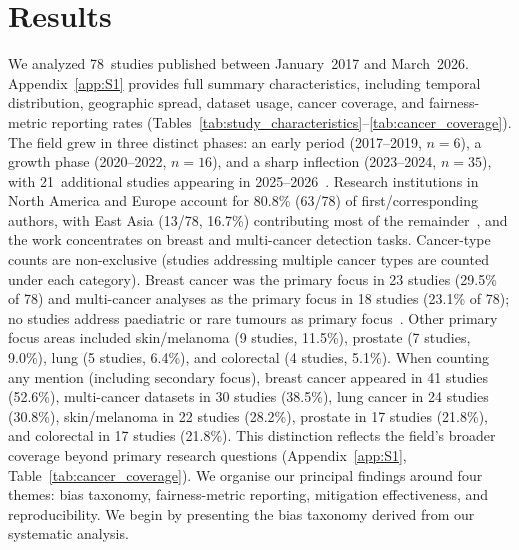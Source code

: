 
\section{Results}
\label{sec:results}

We analyzed 78~studies published between January~2017 and March~2026.
\label{sec:results:temporal}
\label{sec:results:characteristics}
\label{sec:results:cancer}
Appendix~\ref{app:S1} provides full summary characteristics,
including temporal distribution, geographic spread, dataset usage,
cancer coverage, and fairness-metric reporting rates
(Tables~\ref{tab:study_characteristics}--\ref{tab:cancer_coverage}).
The field grew in three distinct phases: an early period (2017--2019,
$n=6$), a growth phase (2020--2022, $n=16$), and a sharp inflection
(2023--2024, $n=35$), with 21~additional studies appearing in
2025--2026~\citep{howard2021site, vaidya2024demographic,
komen2024batch}. Research institutions in North America and Europe account for 80.8\% (63/78) of first/corresponding authors, with East Asia (13/78, 16.7\%) contributing most of the remainder~\citep{celi2022sources, musa2026cross},
and the work concentrates on breast and multi-cancer detection tasks.
Cancer-type counts are non-exclusive (studies addressing multiple cancer types are counted under each category). Breast cancer was the primary focus in 23 studies (29.5\% of 78) and multi-cancer analyses as the primary focus in 18 studies (23.1\% of 78); no studies address paediatric or rare tumours as primary focus~\citep{tasci2022bias}. Other primary focus areas included skin/melanoma (9 studies, 11.5\%), prostate (7 studies, 9.0\%), lung (5 studies, 6.4\%), and colorectal (4 studies, 5.1\%). When counting any mention (including secondary focus), breast cancer appeared in 41 studies (52.6\%), multi-cancer datasets in 30 studies (38.5\%), lung cancer in 24 studies (30.8\%), skin/melanoma in 22 studies (28.2\%), prostate in 17 studies (21.8\%), and colorectal in 17 studies (21.8\%). This distinction reflects the field's broader coverage beyond primary research questions (Appendix~\ref{app:S1}, Table~\ref{tab:cancer_coverage}).
We organise our principal findings around four themes: bias taxonomy,
fairness-metric reporting, mitigation effectiveness, and
reproducibility. We begin by presenting the bias taxonomy derived from our systematic analysis.

